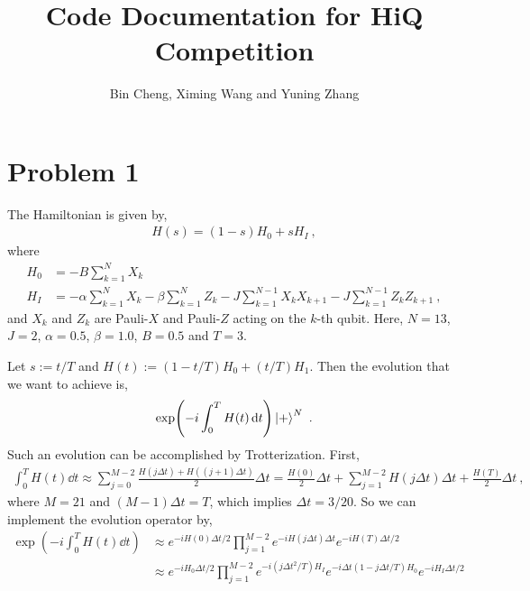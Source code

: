 \documentclass[a4paper, 11pt]{article}
\title{Code Documentation for HiQ Competition}
\author{Bin Cheng, Ximing Wang and Yuning Zhang}
\numberwithin{equation}{section}
\theoremstyle{definition}
\begin{document}
\maketitle


\section{Problem 1}

The Hamiltonian is given by,
\begin{align}
H(s) = (1 - s)H_0 + s H_I \ ,
\end{align}
where 
\begin{align}
H_0 &= -B \sum_{k = 1}^N X_k \\
H_I &= -\alpha \sum_{k=1}^N X_k - \beta \sum_{k=1}^N Z_k - J \sum_{k = 1}^{N - 1} X_k X_{k + 1} - J \sum_{k = 1}^{N - 1} Z_k Z_{k + 1} \ ,
\end{align}
and $X_k$ and $Z_k$ are Pauli-$X$ and Pauli-$Z$ acting on the $k$-th qubit. Here, $N = 13$, $J = 2$, $\alpha = 0.5$, $\beta = 1.0$, $B = 0.5$ and $T = 3$. 

Let $s := t/T$ and $H(t) := (1 - t/T) H_0 + (t/T)H_1$. Then the evolution that we want to achieve is,
\begin{align}
\exp(-i \int_0^T H(t) \dd{t}) \ket{+}^{N} \ .
\end{align}
Such an evolution can be accomplished by Trotterization. First,
\begin{align}
    \int_0^T H(t) \dd{t} \approx \sum_{j = 0}^{M - 2} \frac{H(j \Delta t) + H( (j+1) \Delta t)}{2} \Delta t = \frac{H(0)}{2} \Delta t + \sum_{j = 1}^{M-2} H(j \Delta t) \Delta t + \frac{H(T)}{2} \Delta t \ ,
\end{align}
where $M = 21$ and $(M-1) \Delta t = T$, which implies $\Delta t = 3/20$. So we can implement the evolution operator by,
\begin{align}
\exp(-i \int_0^T H(t) \dd{t}) &\approx e^{-i H(0) \Delta t /2} \prod_{j = 1}^{M-2} e^{-i H(j \Delta t) \Delta t} e^{-i H(T) \Delta t /2} \\
&\approx e^{-i H_0 \Delta t /2} \prod_{j = 1}^{M-2} e^{-i (j \Delta t^2/T) H_I} e^{-i \Delta t (1 - j \Delta t /T) H_0} e^{-i H_I \Delta t /2}
\end{align}
\end{document}
